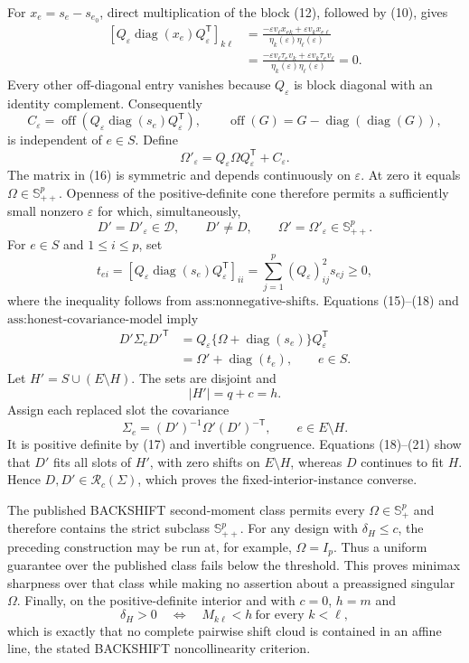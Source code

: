 For \(x_e=s_e-s_{e_0}\), direct multiplication of the block (12), followed by (10), gives
\[
 \begin{aligned}
 [Q_\varepsilon\operatorname{diag}(x_e)Q_\varepsilon^{\mathsf T}]_{k\ell}
 &=\frac{-\varepsilon v_\ell x_{ek}+\varepsilon v_kx_{e\ell}}
 {\eta_k(\varepsilon)\eta_\ell(\varepsilon)}\\
 &=\frac{-\varepsilon v_\ell\tau_ev_k+\varepsilon v_k\tau_ev_\ell}
 {\eta_k(\varepsilon)\eta_\ell(\varepsilon)}=0.
 \end{aligned} \tag{14}
\]
Every other off-diagonal entry vanishes because \(Q_\varepsilon\) is block diagonal with an identity complement.  Consequently
\[
 C_\varepsilon
 =\operatorname{off}\!\left(Q_\varepsilon\operatorname{diag}(s_e)Q_\varepsilon^{\mathsf T}\right),
 \qquad \operatorname{off}(G)=G-\operatorname{diag}(\operatorname{diag}(G)), \tag{15}
\]
is independent of \(e\in S\).  Define
\[
 \Omega'_\varepsilon=Q_\varepsilon\Omega Q_\varepsilon^{\mathsf T}+C_\varepsilon. \tag{16}
\]
The matrix in (16) is symmetric and depends continuously on \(\varepsilon\).  At zero it equals \(\Omega\in\mathbb S_{++}^p\).  Openness of the positive-definite cone therefore permits a sufficiently small nonzero \(\varepsilon\) for which, simultaneously,
\[
 D'=D'_\varepsilon\in\mathcal D,\qquad D'\ne D,\qquad
 \Omega'=\Omega'_\varepsilon\in\mathbb S_{++}^p. \tag{17}
\]
For \(e\in S\) and \(1\le i\le p\), set
\[
 t_{ei}
 =[Q_\varepsilon\operatorname{diag}(s_e)Q_\varepsilon^{\mathsf T}]_{ii}
 =\sum_{j=1}^p(Q_\varepsilon)_{ij}^2s_{ej}\ge0, \tag{18}
\]
where the inequality follows from \(\text{ass:nonnegative-shifts}\).  Equations (15)--(18) and \(\text{ass:honest-covariance-model}\) imply
\[
 \begin{aligned}
 D'\Sigma_eD'^{\mathsf T}
 &=Q_\varepsilon\{\Omega+\operatorname{diag}(s_e)\}Q_\varepsilon^{\mathsf T}\\
 &=\Omega'+\operatorname{diag}(t_e),
 \qquad e\in S. 
 \end{aligned} \tag{19}
\]
Let \(H'=S\cup(E\setminus H)\).  The sets are disjoint and
\[
 |H'|=q+c=h. \tag{20}
\]
Assign each replaced slot the covariance
\[
 \Sigma_e=(D')^{-1}\Omega'(D')^{-\mathsf T},
 \qquad e\in E\setminus H. \tag{21}
\]
It is positive definite by (17) and invertible congruence.  Equations (18)--(21) show that \(D'\) fits all slots of \(H'\), with zero shifts on \(E\setminus H\), whereas \(D\) continues to fit \(H\).  Hence \(D,D'\in\mathcal R_c(\Sigma)\), which proves the fixed-interior-instance converse.

The published BACKSHIFT second-moment class permits every \(\Omega\in\mathbb S_+^p\) and therefore contains the strict subclass \(\mathbb S_{++}^p\).  For any design with \(\delta_H\le c\), the preceding construction may be run at, for example, \(\Omega=I_p\).  Thus a uniform guarantee over the published class fails below the threshold.  This proves minimax sharpness over that class while making no assertion about a preassigned singular \(\Omega\).  Finally, on the positive-definite interior and with \(c=0\), \(h=m\) and
\[
 \delta_H>0
 \quad\Longleftrightarrow\quad
 M_{k\ell}<h\ \text{for every }k<\ell,
\]
which is exactly that no complete pairwise shift cloud is contained in an affine line, the stated BACKSHIFT noncollinearity criterion.